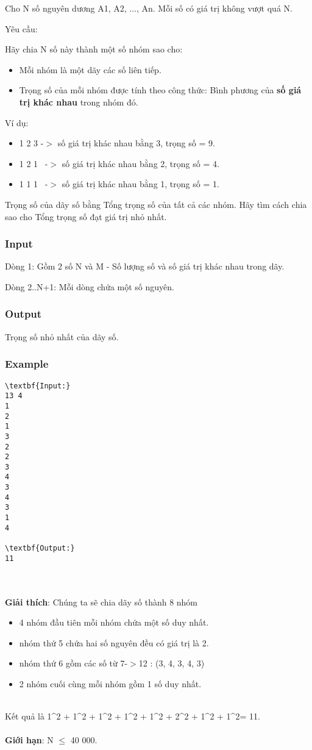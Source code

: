 

Cho N số nguyên dương A1, A2, ..., An. Mỗi số có giá trị không vượt quá N.

Yêu cầu:

Hãy chia N số này thành một số nhóm sao cho:
\begin{itemize}
	\item Mỗi nhóm là một dãy các số liên tiếp.
	\item Trọng số của mỗi nhóm được tính theo công thức: Bình phương của \textbf{số giá trị khác nhau} trong nhóm đó.
\end{itemize}

Ví dụ:
\begin{itemize}
	\item 1 2 3 -$>$ số giá trị khác nhau bằng 3, trọng số = 9.
	\item 1 2 1  -$>$ số giá trị khác nhau bằng 2, trọng số = 4.
	\item 1 1 1  -$>$ số giá trị khác nhau bằng 1, trọng số = 1.
\end{itemize}

Trọng số của dãy số bằng Tổng trọng số của tất cả các nhóm. Hãy tìm cách chia sao cho Tổng trọng số đạt giá trị nhỏ nhất.

\subsubsection{Input}

Dòng 1: Gồm 2 số N và M - Số lượng số và số giá trị khác nhau trong dãy.

Dòng 2..N+1: Mỗi dòng chứa một số nguyên.

\subsubsection{Output}

Trọng số nhỏ nhất của dãy số.

\subsubsection{Example}
\begin{verbatim}
\textbf{Input:}
13 4
1
2
1
3
2
2
3
4
3
4
3
1
4

\textbf{Output:}
11\end{verbatim}


\\
\\\textbf{Giải thích}: Chúng ta sẽ chia dãy số thành 8 nhóm
\begin{itemize}
	\item 4 nhóm đầu tiên mỗi nhóm chứa một số duy nhất.
	\item nhóm thứ 5 chứa hai số nguyên đều có giá trị là 2.
	\item nhóm thứ 6 gồm các số từ 7-$>$12 : (3, 4, 3, 4, 3)
	\item 2 nhóm cuối cùng mỗi nhóm gồm 1 số duy nhất.
\end{itemize}


\\Kết quả là 1^2 + 1^2 + 1^2 + 1^2 + 1^2 + 2^2 + 1^2 + 1^2= 11.
\\
\\\textbf{Giới hạn}: N  $\le$  40 000.
